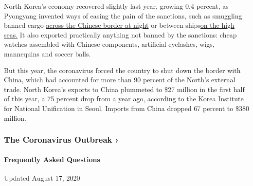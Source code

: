 North Korea's economy recovered slightly last year, growing 0.4 percent,
as Pyongyang invented ways of easing the pain of the sanctions, such as
smuggling banned cargo
\href{http://vod.kbs.co.kr/index.html?source=episode\&sname=vod\&stype=vod\&program_code=T2011-1097\&program_id=PS-2019197532-01-000\&section_code=05\&broadcast_complete_yn=N\&local_station_code=00\&section_sub_code=06}{across
the Chinese border at night} or between
ships\href{https://www.nytimes3xbfgragh.onion/2018/01/18/world/asia/north-korea-oil-smuggling.html}{on
the high seas.} It also exported practically anything not banned by the
sanctions: cheap watches assembled with Chinese components, artificial
eyelashes, wigs, mannequins and soccer balls.

But this year, the coronavirus forced the country to shut down the
border with China, which had accounted for more than 90 percent of the
North's external trade. North Korea's exports to China plummeted to \$27
million in the first half of this year, a 75 percent drop from a year
ago, according to the Korea Institute for National Unification in Seoul.
Imports from China dropped 67 percent to \$380 million.

\href{https://www.nytimes3xbfgragh.onion/news-event/coronavirus?action=click\&pgtype=Article\&state=default\&region=MAIN_CONTENT_3\&context=storylines_faq}{}

\hypertarget{the-coronavirus-outbreak-}{%
\subsubsection{The Coronavirus Outbreak
›}\label{the-coronavirus-outbreak-}}

\hypertarget{frequently-asked-questions}{%
\paragraph{Frequently Asked
Questions}\label{frequently-asked-questions}}

Updated August 17, 2020

